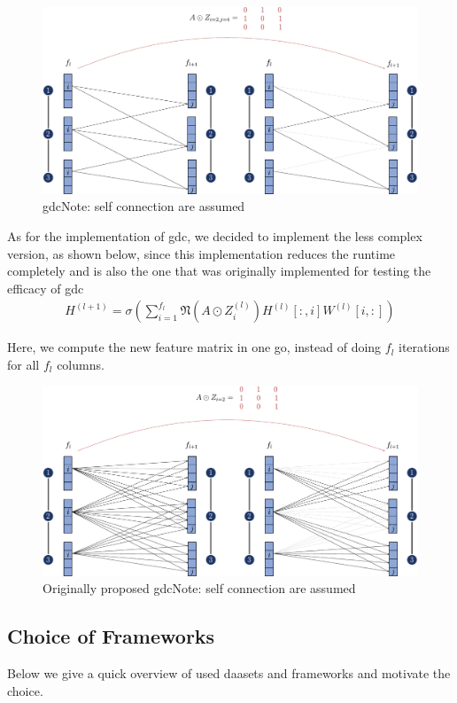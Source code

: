 \begin{figure}[ht]
    \centering
    \includegraphics[width= 0.90\linewidth]{gfx/implementation/GDC-eq4.pdf}
    \caption{\Ac{gdc}Note: self connection are assumed}\label{fig:implementaion:GDC-eq4}
\end{figure}


As for the implementation of \ac{gdc}, we decided to implement the less complex version, as shown below, since this implementation reduces the runtime completely and is also the one that was originally implemented for testing the efficacy of \ac{gdc}
\begin{align}
    H^{(l+1)} = \sigma(\sum_{i= 1}^{f_{l}}\mathfrak{N}(A \odot Z_{i}^{(l)})H^{(l)}[:,i] W^{(l)}[i,:])
\end{align}

Here, we compute the new feature matrix in one go, instead of doing $f_{l}$ iterations for all $f_{l}$ columns.
\begin{figure}[ht]
    \centering
    \includegraphics[width= 0.90\linewidth]{gfx/implementation/GDC-eq5.pdf}
    \caption{Originally proposed \ac{gdc}Note: self connection are assumed}\label{fig:implementaion:GDC-eq5}
\end{figure}

\subsection{Choice of Frameworks}
\label{sec:implement:setup:choice}
Below we give a quick overview of used daasets and frameworks and motivate the choice.


